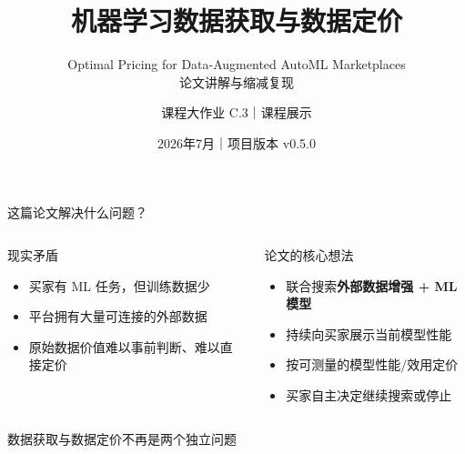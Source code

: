 \documentclass[aspectratio=169,10pt]{ctexbeamer}
\title{机器学习数据获取与数据定价}
\subtitle{Optimal Pricing for Data-Augmented AutoML Marketplaces\\论文讲解与缩减复现}
\author{课程大作业 C.3｜课程展示}
\date{2026年7月｜项目版本 v0.5.0}
\begin{document}
\begin{frame}
  \titlepage
\end{frame}

\begin{frame}{这篇论文解决什么问题？}
\begin{columns}[T,onlytextwidth]
\begin{block}{现实矛盾}
\begin{itemize}
  \item 买家有 ML 任务，但训练数据少
  \item 平台拥有大量可连接的外部数据
  \item 原始数据价值难以事前判断、难以直接定价
\end{itemize}
\end{block}
\begin{exampleblock}{论文的核心想法}
\begin{itemize}
  \item 联合搜索\textbf{外部数据增强 + ML 模型}
  \item 持续向买家展示当前模型性能
  \item 按可测量的模型性能/效用定价
  \item 买家自主决定继续搜索或停止
\end{itemize}
\end{exampleblock}
\end{columns}
\vspace{0.5em}
\centering
\large 数据获取与数据定价不再是两个独立问题
\end{frame}
\end{document}

